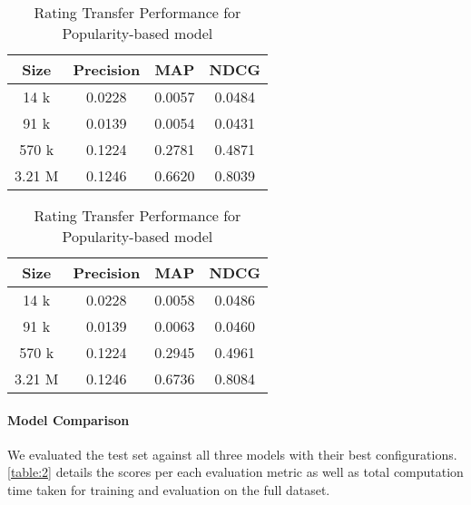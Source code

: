 \documentclass{article}
\begin{document}
\begin{table}[h]
    \begin{minipage}{.5\textwidth}
        \centering
        \begin{tabular}{cccc}
        \hline 
        \textbf{Size} & \textbf{Precision} & \textbf{MAP} & \textbf{NDCG}\\ 
        \hline
        14 k & 0.0228 & 0.0057 & 0.0484  \\
        91 k & 0.0139 & 0.0054 & 0.0431  \\
        570 k & 0.1224 & 0.2781 & 0.4871  \\
        3.21 M & 0.1246 & 0.6620 & 0.8039  \\
        \hline
        \end{tabular}
        \caption{Original Count Performance for Popularity-based model}
    \end{minipage}
    \hfill
    \begin{minipage}{.5\textwidth}
        \centering
        \begin{tabular}{cccc}
        \hline 
        \textbf{Size} & \textbf{Precision} & \textbf{MAP} & \textbf{NDCG} \\ 
        \hline
        14 k & 0.0228 & 0.0058 & 0.0486  \\
        91 k & 0.0139 & 0.0063 & 0.0460  \\
        570 k & 0.1224 & 0.2945 & 0.4961  \\
        3.21 M & 0.1246 & 0.6736 & 0.8084  \\
        \hline
        \end{tabular}
        \caption{Rating Transfer Performance for Popularity-based model}
    \end{minipage}
\end{table}

\paragraph{Model Comparison} We evaluated the test set against all three models with their best configurations. \cref{table:2} details the scores per each evaluation metric as well as total computation time taken for training and evaluation on the full dataset.
\end{document}

